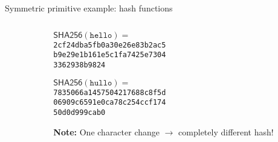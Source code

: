 \documentclass[aspectratio=169, lualatex, handout]{beamer}
\begin{document}
\begin{frame}{Symmetric primitive example: hash functions}
	\begin{columns}[c]
		\begin{column}{0.55\textwidth}
		\end{column}
		\begin{column}{0.45\textwidth}
			\begin{tcolorbox}
				[colback=black!5!white,colframe=ciphergray] $\mathsf{SHA256}(\texttt{hello}) =$ \\ \texttt{2cf24dba5fb0a30e26e83b2ac5}\\ \texttt{b9e29e1b161e5c1fa7425e7304}\\
				\texttt{3362938b9824}

				$\mathsf{SHA256}(\texttt{hullo}) =$ \\ \texttt{7835066a1457504217688c8f5d}\\
				\texttt{06909c6591e0ca78c254ccf174}\\ \texttt{50d0d999cab0}
			\end{tcolorbox}
			\textcolor{cipherprimary}{\textbf{Note:} \small One character change $\rightarrow$
				completely different hash!}
		\end{column}
	\end{columns}
\end{frame}
\end{document}
